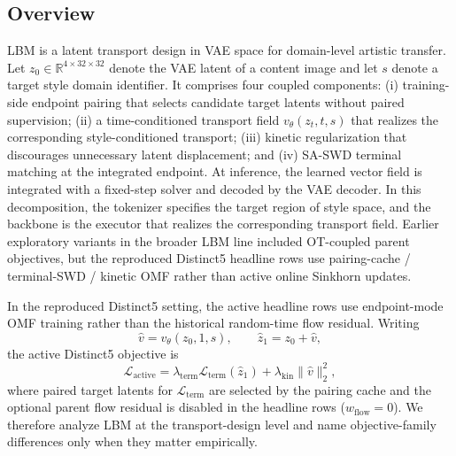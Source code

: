 \documentclass[letterpaper]{article}
\begin{document}
\subsection{Overview}
LBM is a latent transport design in VAE space for domain-level artistic transfer. Let $z_0 \in \mathbb{R}^{4 \times 32 \times 32}$ denote the VAE latent of a content image and let $s$ denote a target style domain identifier. It comprises four coupled components: (i) training-side endpoint pairing that selects candidate target latents without paired supervision; (ii) a time-conditioned transport field $v_\theta(z_t,t,s)$ that realizes the corresponding style-conditioned transport; (iii) kinetic regularization that discourages unnecessary latent displacement; and (iv) SA-SWD terminal matching at the integrated endpoint. At inference, the learned vector field is integrated with a fixed-step solver and decoded by the VAE decoder. In this decomposition, the tokenizer specifies the target region of style space, and the backbone is the executor that realizes the corresponding transport field. Earlier exploratory variants in the broader LBM line included OT-coupled parent objectives, but the reproduced Distinct5 headline rows use pairing-cache / terminal-SWD / kinetic OMF rather than active online Sinkhorn updates.

In the reproduced Distinct5 setting, the active headline rows use endpoint-mode OMF training rather than the historical random-time flow residual. Writing
\begin{equation}
    \hat v = v_\theta(z_0,1,s), \qquad \hat z_1 = z_0 + \hat v,
\end{equation}
the active Distinct5 objective is
\begin{equation}
    \mathcal{L}_{\mathrm{active}} = \lambda_{\mathrm{term}}\mathcal{L}_{\mathrm{term}}(\hat z_1) + \lambda_{\mathrm{kin}}\|\hat v\|_2^2,
    \label{eq:active_distinct5_loss}
\end{equation}
where paired target latents for $\mathcal{L}_{\mathrm{term}}$ are selected by the pairing cache and the optional parent flow residual is disabled in the headline rows ($w_{\mathrm{flow}}=0$). We therefore analyze LBM at the transport-design level and name objective-family differences only when they matter empirically.
\end{document}
